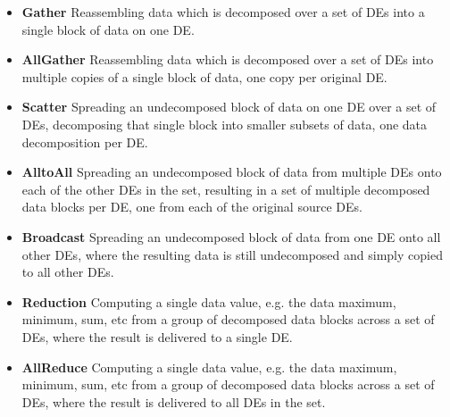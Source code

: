 \begin{itemize}

\item {\bf Gather}
Reassembling data which is decomposed over a set of DEs into a single
block of data on one DE.
\item {\bf AllGather}
Reassembling data which is decomposed over a set of DEs into multiple
copies of a single block of data, one copy per original DE.
\item {\bf Scatter}
Spreading an undecomposed block of data on one DE over a set of DEs,
decomposing that single block into smaller subsets of data, one
data decomposition per DE.
\item {\bf AlltoAll}
Spreading an undecomposed block of data from multiple DEs onto
each of the other DEs in the set, resulting in a set of multiple decomposed 
data blocks per DE, one from each of the original source DEs.
\item {\bf Broadcast}
Spreading an undecomposed block of data from one DE onto all other
DEs, where the resulting data is still undecomposed and simply
copied to all other DEs.
\item {\bf Reduction}
Computing a single data value, e.g. the data maximum, minimum, sum, etc
from a group of decomposed data blocks across a set of DEs, where the
result is delivered to a single DE.
\item {\bf AllReduce}
Computing a single data value, e.g. the data maximum, minimum, sum, etc
from a group of decomposed data blocks across a set of DEs, where the
result is delivered to all DEs in the set.

\end{itemize}

\newpage







